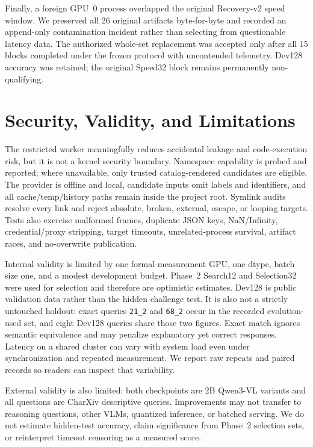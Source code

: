 \documentclass{article}
\begin{document}
Finally, a foreign GPU~0 process overlapped the original Recovery-v2 speed window.
We preserved all 26 original artifacts byte-for-byte and recorded an append-only
contamination incident rather than selecting from questionable latency data. The
authorized whole-set replacement was accepted only after all 15 blocks completed
under the frozen protocol with uncontended telemetry. Dev128 accuracy was retained;
the original Speed32 block remains permanently non-qualifying.

\section{Security, Validity, and Limitations}
The restricted worker meaningfully reduces accidental leakage and code-execution
risk, but it is not a kernel security boundary. Namespace capability is probed
and reported; where unavailable, only trusted catalog-rendered candidates are
eligible. The provider is offline and local, candidate inputs omit labels and
identifiers, and all cache/temp/history paths remain inside the project root.
Symlink audits resolve every link and reject absolute, broken, external, escape,
or looping targets. Tests also exercise malformed frames, duplicate JSON keys,
NaN/Infinity, credential/proxy stripping, target timeouts, unrelated-process
survival, artifact races, and no-overwrite publication.

Internal validity is limited by one formal-measurement GPU, one dtype, batch size
one, and a modest development budget. Phase~2 Search12 and Selection32 were used for selection and
therefore are optimistic estimates. Dev128 is public validation data rather than
the hidden challenge test. It is also not a strictly untouched holdout: exact
queries \texttt{21\_2} and \texttt{68\_2} occur in the recorded evolution-used
set, and eight Dev128 queries share those two figures. Exact match ignores semantic equivalence and may
penalize explanatory yet correct responses. Latency on a shared cluster can vary
with system load even under synchronization and repeated measurement. We report
raw repeats and paired records so readers can inspect that variability.

External validity is also limited: both checkpoints are 2B Qwen3-VL variants and
all questions are CharXiv descriptive queries. Improvements may not transfer to
reasoning questions, other VLMs, quantized inference, or batched serving. We do
not estimate hidden-test accuracy, claim significance from Phase~2 selection
sets, or reinterpret timeout censoring as a measured score.
\end{document}

